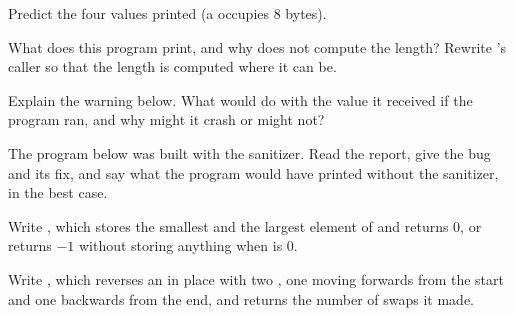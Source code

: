 \begin{exercise}[$\star$]\label{exo:b1:pointers-and-arrays:3}
Predict the four values printed (a  occupies 8 bytes).
\end{exercise}

\begin{exercise}[$\star$]\label{exo:b1:pointers-and-arrays:4}
What does this program print, and why does  not compute the length? Rewrite 's caller so
that the length is computed where it can be.
\end{exercise}

\begin{exercise}[$\star\star$]\label{exo:b1:pointers-and-arrays:5}
Explain the warning below. What would  do with the value it received if the program ran, and why might it
crash or might not?
\end{exercise}

\begin{exercise}[$\star\star$]\label{exo:b1:pointers-and-arrays:6}
The program below was built with the  sanitizer. Read the report, give the bug and its fix, and say what the
program would have printed without the sanitizer, in the best case.
\end{exercise}

\begin{exercise}[$\star\star$]\label{exo:b1:pointers-and-arrays:7}
Write , which stores the smallest and the largest
element of  and returns 0, or returns $-1$ without storing anything when  is 0.
\end{exercise}

\begin{exercise}[$\star\star$]\label{exo:b1:pointers-and-arrays:8}
Write , which reverses an  in place with two , one moving
forwards from the start and one backwards from the end, and returns the number of swaps it made.
\end{exercise}

